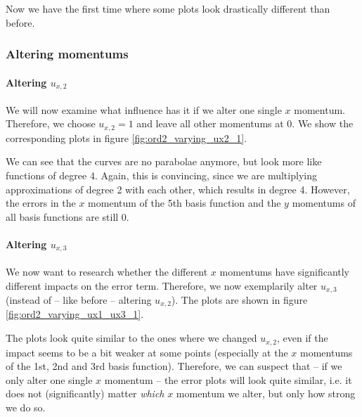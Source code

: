 \documentclass{article}
\begin{document}


Now we have the first time where some plots look drastically different than before.

\clearpage{}

\subsubsection{Altering momentums}
\label{sec:stiffness-analysis-ord2-altering-momentums}

\paragraph{\texorpdfstring{Altering $u_{x,2}$}{Altering ux2}}

We will now examine what influence has it if we alter one single $x$ momentum. Therefore, we choose $u_{x,2}=1$ and leave all other momentums at 0. We show the corresponding plots in figure \ref{fig:ord2_varying_ux2_1}.



We can see that the curves are no parabolae anymore, but look more like functions of degree 4. Again, this is convincing, since we are multiplying approximations of degree 2 with each other, which results in degree 4. However, the errors in the $x$ momentum of the 5th basis function and the $y$ momentums of all basis functions are still 0.

\paragraph{\texorpdfstring{Altering $u_{x,3}$}{Altering ux3}}

We now want to research whether the different $x$ momentums have significantly different impacts on the error term. Therefore, we now exemplarily alter $u_{x,3}$ (instead of -- like before -- altering $u_{x,2}$). The plots are shown in figure \ref{fig:ord2_varying_ux1_ux3_1}.



The plots look quite similar to the ones where we changed $u_{x,2}$, even if the impact seems to be a bit weaker at some points (especially at the $x$ momentums of the 1st, 2nd and 3rd basis function). Therefore, we can suspect that -- if we only alter one single $x$ momentum -- the error plots will look quite similar, i.e. it does not (significantly) matter \emph{which} $x$ momentum we alter, but only how strong we do so.
\end{document}
